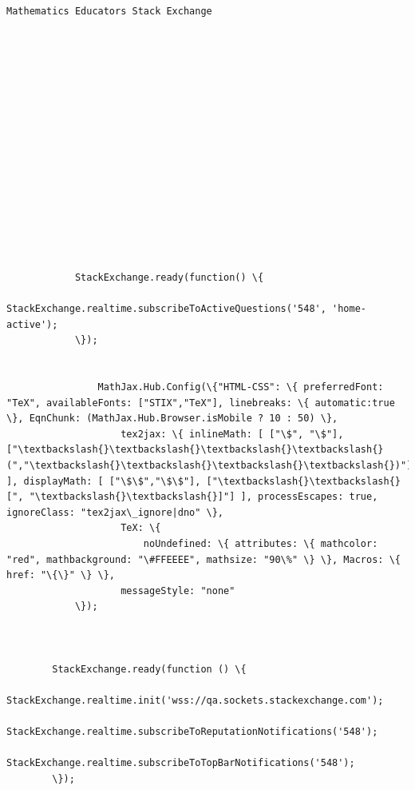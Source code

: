 \documentclass[11pt]{article}
\begin{document}
    \begin{Verbatim}[commandchars=\\\{\}]



Mathematics Educators Stack Exchange
















            StackExchange.ready(function() \{
                StackExchange.realtime.subscribeToActiveQuestions('548', 'home-active');
            \});
        

                MathJax.Hub.Config(\{"HTML-CSS": \{ preferredFont: "TeX", availableFonts: ["STIX","TeX"], linebreaks: \{ automatic:true \}, EqnChunk: (MathJax.Hub.Browser.isMobile ? 10 : 50) \},
                    tex2jax: \{ inlineMath: [ ["\$", "\$"], ["\textbackslash{}\textbackslash{}\textbackslash{}\textbackslash{}(","\textbackslash{}\textbackslash{}\textbackslash{}\textbackslash{})"] ], displayMath: [ ["\$\$","\$\$"], ["\textbackslash{}\textbackslash{}[", "\textbackslash{}\textbackslash{}]"] ], processEscapes: true, ignoreClass: "tex2jax\_ignore|dno" \},
                    TeX: \{ 
                        noUndefined: \{ attributes: \{ mathcolor: "red", mathbackground: "\#FFEEEE", mathsize: "90\%" \} \}, Macros: \{ href: "\{\}" \} \},
                    messageStyle: "none"
            \});
            


        StackExchange.ready(function () \{
            StackExchange.realtime.init('wss://qa.sockets.stackexchange.com');
            StackExchange.realtime.subscribeToReputationNotifications('548');
                StackExchange.realtime.subscribeToTopBarNotifications('548');
        \});
    


\end{Verbatim}
\end{document}

